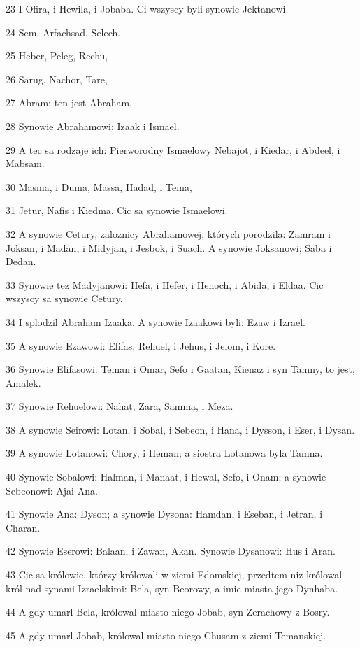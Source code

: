 \par 23 I Ofira, i Hewila, i Jobaba. Ci wszyscy byli synowie Jektanowi.
\par 24 Sem, Arfachsad, Selech.
\par 25 Heber, Peleg, Rechu,
\par 26 Sarug, Nachor, Tare,
\par 27 Abram; ten jest Abraham.
\par 28 Synowie Abrahamowi: Izaak i Ismael.
\par 29 A tec sa rodzaje ich: Pierworodny Ismaelowy Nebajot, i Kiedar, i Abdeel, i Mabsam.
\par 30 Masma, i Duma, Massa, Hadad, i Tema,
\par 31 Jetur, Nafis i Kiedma. Cic sa synowie Ismaelowi.
\par 32 A synowie Cetury, zaloznicy Abrahamowej, których porodzila: Zamram i Joksan, i Madan, i Midyjan, i Jesbok, i Suach. A synowie Joksanowi; Saba i Dedan.
\par 33 Synowie tez Madyjanowi: Hefa, i Hefer, i Henoch, i Abida, i Eldaa. Cic wszyscy sa synowie Cetury.
\par 34 I splodzil Abraham Izaaka. A synowie Izaakowi byli: Ezaw i Izrael.
\par 35 A synowie Ezawowi: Elifas, Rehuel, i Jehus, i Jelom, i Kore.
\par 36 Synowie Elifasowi: Teman i Omar, Sefo i Gaatan, Kienaz i syn Tamny, to jest, Amalek.
\par 37 Synowie Rehuelowi: Nahat, Zara, Samma, i Meza.
\par 38 A synowie Seirowi: Lotan, i Sobal, i Sebeon, i Hana, i Dysson, i Eser, i Dysan.
\par 39 A synowie Lotanowi: Chory, i Heman; a siostra Lotanowa byla Tamna.
\par 40 Synowie Sobalowi: Halman, i Manaat, i Hewal, Sefo, i Onam; a synowie Sebeonowi: Ajai Ana.
\par 41 Synowie Ana: Dyson; a synowie Dysona: Hamdan, i Eseban, i Jetran, i Charan.
\par 42 Synowie Eserowi: Balaan, i Zawan, Akan. Synowie Dysanowi: Hus i Aran.
\par 43 Cic sa królowie, którzy królowali w ziemi Edomskiej, przedtem niz królowal król nad synami Izraelskimi: Bela, syn Beorowy, a imie miasta jego Dynhaba.
\par 44 A gdy umarl Bela, królowal miasto niego Jobab, syn Zerachowy z Bosry.
\par 45 A gdy umarl Jobab, królowal miasto niego Chusam z ziemi Temanskiej.
